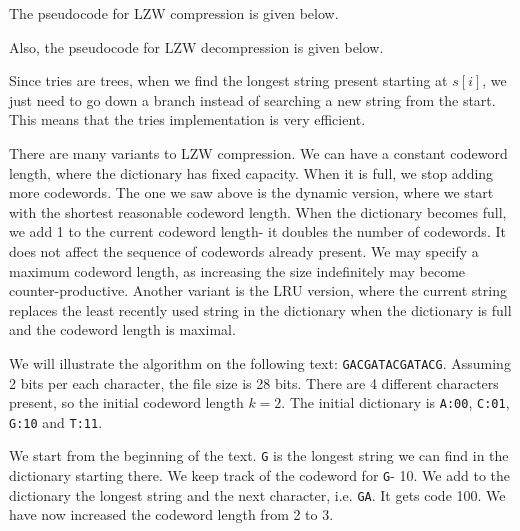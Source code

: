 \documentclass[a4paper, openany]{memoir}
\begin{document}
The pseudocode for LZW compression is given below.

Also, the pseudocode for LZW decompression is given below.


Since tries are trees, when we find the longest string present starting at $s[i]$, we just need to go down a branch instead of searching a new string from the start. This means that the tries implementation is very efficient.

There are many variants to LZW compression. We can have a constant codeword length, where the dictionary has fixed capacity. When it is full, we stop adding more codewords. The one we saw above is the dynamic version, where we start with the shortest reasonable codeword length. When the dictionary becomes full, we add 1 to the current codeword length- it doubles the number of codewords. It does not affect the sequence of codewords already present. We may specify a maximum codeword length, as increasing the size indefinitely may become counter-productive. Another variant is the LRU version, where the current string replaces the least recently used string in the dictionary when the dictionary is full and the codeword length is maximal.

We will illustrate the algorithm on the following text: \texttt{GACGATACGATACG}. Assuming 2 bits per each character, the file size is 28 bits. There are 4 different characters present, so the initial codeword length $k = 2$. The initial dictionary is \texttt{A:00}, \texttt{C:01}, \texttt{G:10} and \texttt{T:11}.

We start from the beginning of the text. \texttt{G} is the longest string we can find in the dictionary starting there. We keep track of the codeword for \texttt{G}- 10. We add to the dictionary the longest string and the next character, i.e. \texttt{GA}. It gets code 100. We have now increased the codeword length from 2 to 3.
\end{document}
